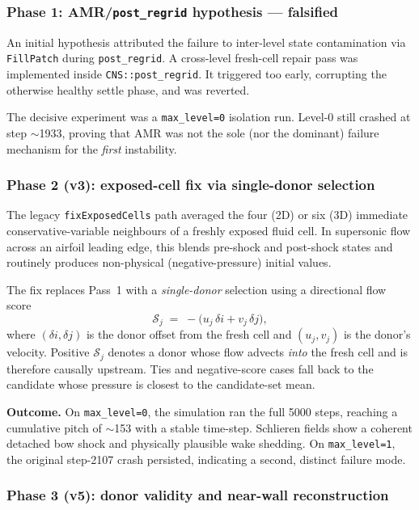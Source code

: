 \subsubsection{Phase 1: AMR/\texttt{post\_regrid} hypothesis --- falsified}

An initial hypothesis attributed the failure to inter-level state
contamination via \texttt{FillPatch} during \texttt{post\_regrid}. A cross-level
fresh-cell repair pass was implemented inside
\texttt{CNS::post\_regrid}. It triggered too early, corrupting the otherwise
healthy settle phase, and was reverted.

The decisive experiment was a \texttt{max\_level=0} isolation run. Level-0 still
crashed at step $\sim$1933, proving that AMR was not the sole (nor the
dominant) failure mechanism for the \emph{first} instability.

\subsubsection{Phase 2 (v3): exposed-cell fix via single-donor selection}

The legacy \texttt{fixExposedCells} path averaged the four (2D) or six (3D)
immediate conservative-variable neighbours of a freshly exposed fluid cell.
In supersonic flow across an airfoil leading edge, this blends pre-shock and
post-shock states and routinely produces non-physical (negative-pressure)
initial values.

The fix replaces Pass~1 with a \emph{single-donor} selection using a
directional flow score
\begin{equation}
  \mathcal{S}_j \;=\; -\bigl(u_j\,\delta i + v_j\,\delta j\bigr),
  \label{eq:score}
\end{equation}
where $(\delta i, \delta j)$ is the donor offset from the fresh cell and
$(u_j,v_j)$ is the donor's velocity. Positive $\mathcal{S}_j$ denotes a
donor whose flow advects \emph{into} the fresh cell and is therefore
causally upstream. Ties and negative-score cases fall back to the candidate
whose pressure is closest to the candidate-set mean.

\textbf{Outcome.} On \texttt{max\_level=0}, the simulation ran the full
5000 steps, reaching a cumulative pitch of $\sim$153\textdegree{} with a
stable time-step. Schlieren fields show a coherent detached bow shock and
physically plausible wake shedding. On \texttt{max\_level=1}, the original
step-2107 crash persisted, indicating a second, distinct failure mode.

\subsubsection{Phase 3 (v5): donor validity and near-wall reconstruction}

